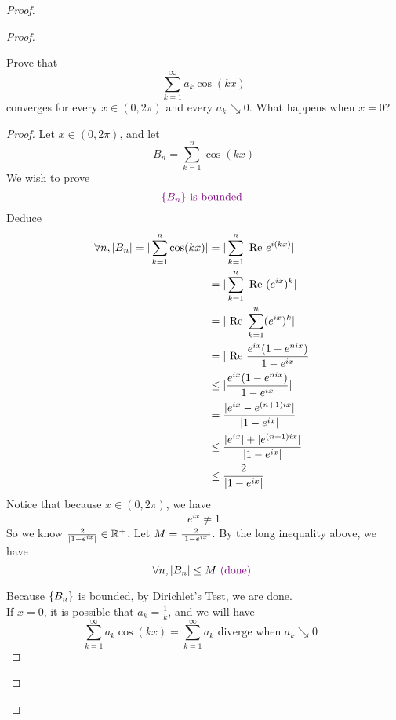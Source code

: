 \documentclass{report}
\begin{document}
\begin{proof}
\begin{proof}
\begin{question}{}{}
Prove that 
\[
\sum_{k=1}^{\infty} a_k \cos(kx)
\]
converges for every \( x \in (0, 2\pi) \) and every \( a_k \searrow 0 \). What happens when \( x = 0 \)?
\end{question}
\begin{proof}
Let $x\in (0,2\pi)$, and let 
\begin{equation}
B_n=\sum_{k=1}^n \cos(kx)
\end{equation}
We wish to prove
\begin{equation}
\textcolor{violet}{\{ B_n \}\text{ is bounded }}
\end{equation}
Deduce
\begin{align}
  \forall n,|B_n|=|\sum_{k=1}^n \cos (kx)|&= |\sum_{k=1}^n \text{ Re }e^{i(kx)}|\\
  &=|\sum_{k=1}^n \text{ Re }(e^{ix})^k|\\
  &=|\text{ Re }\sum_{k=1}^n (e^{ix})^k|\\
  &=|\text{ Re }\frac{e^{ix}(1-e^{nix})}{1-e^{ix}}|\\
  &\leq |\frac{e^{ix}(1-e^{nix})}{1-e^{ix}}|\\
  &=\frac{|e^{ix}-e^{(n+1)ix}|}{|1-e^{ix}|}\\
  &\leq \frac{|e^{ix}|+|e^{(n+1)ix}|}{|1-e^{ix}|}\\
  &\leq \frac{2}{|1-e^{ix}|}
\end{align}
Notice that because $x\in (0,2\pi)$, we have
\begin{equation}
e^{ix}\neq 1
\end{equation}
So we know $\frac{2}{|1-e^{ix}|}\in\mathbb{R}^+$. Let $M=\frac{2}{|1-e^{ix}|}$. By the long inequality above, we have
\begin{equation}
\forall n, |B_n|\leq M\textcolor{violet}{\text{ (done) }}
\end{equation}

Because $\{ B_n \}$ is bounded, by Dirichlet's Test, we are done.\\

If $x=0$, it is possible that  $a_k=\frac{1}{k}$, and we will have
\begin{equation}
\sum_{k=1}^\infty a_k\cos(kx)=\sum_{k=1}^\infty a_k\text{ diverge when $a_k\searrow 0$ }
\end{equation}
\end{proof}


\end{proof}
\end{proof}
\end{document}

